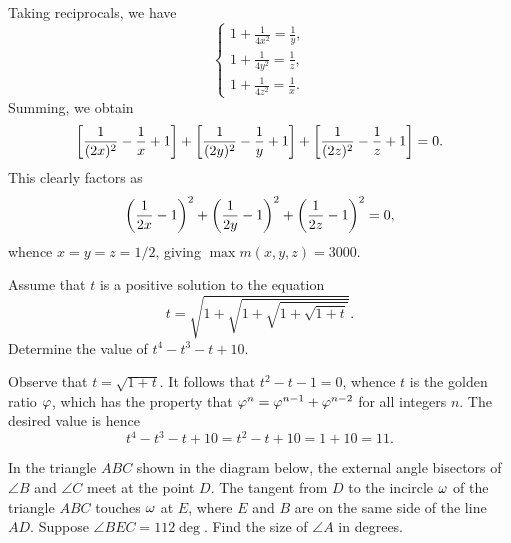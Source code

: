 Taking reciprocals, we have \[\left\{
    \begin{aligned}
        1 + \frac1{4x^2} = \frac1y,\\
        1 + \frac1{4y^2} = \frac1z,\\
        1 + \frac1{4z^2} = \frac1x.
\end{aligned}\right.\] Summing, we obtain \[\left[ \dfrac1{(2x)^2} - \dfrac1x + 1 \right] + \left[ \dfrac1{(2y)^2} - \dfrac1y + 1 \right] + \left[ \dfrac1{(2z)^2} - \dfrac1z + 1 \right] = 0.\] This clearly factors as \[\left( \dfrac1{2x} - 1 \right)^2 + \left( \dfrac1{2y} - 1 \right)^2 + \left( \dfrac1{2z} - 1 \right)^2 = 0,\] whence $x = y = z = 1/2$, giving $\max m(x, y, z) = 3000$.

\clearpage
\begin{question}[11]\label{A::2022-O-1-14}
    Assume that $t$ is a positive solution to the equation \[t = \sqrt{1 + \sqrt{1 + \sqrt{1 + \sqrt{1 + t}}}}.\] Determine the value of $t^4 - t^3 - t + 10$.
\end{question}

Observe that $t = \sqrt{1 + t}$. It follows that $t^2 - t - 1 = 0$, whence $t$ is the golden ratio $\varphi$, which has the property that $\varphi^n = \varphi^{n-1} + \varphi^{n-2}$ for all integers $n$. The desired value is hence \[t^4 - t^3 - t + 10 = t^2 - t + 10 = 1 + 10 = 11.\]

\begin{question}[44]\label{A::2022-O-1-15}
    In the triangle $ABC$ shown in the diagram below, the external angle bisectors of $\angle B$ and $\angle C$ meet at the point $D$. The tangent from $D$ to the incircle $\omega$ of the triangle $ABC$ touches $\omega$ at $E$, where $E$ and $B$ are on the same side of the line $AD$. Suppose $\angle BEC = 112\deg$. Find the size of $\angle A$ in degrees.

    \begin{center}
    \end{center}
\end{question}

